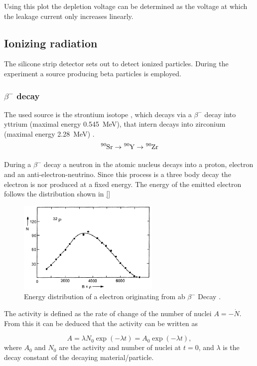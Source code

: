 Using this plot the depletion voltage can be determined as the voltage at which the leakage current only increases linearly.

\subsection{Ionizing radiation}
The silicone strip detector sets out to detect ionized particles. During the experiment a source producing beta particles is employed.
\subsubsection{$\beta^-$ decay}
The used source is the strontium isotope , which decays via a $\beta^-$ decay into yttrium (maximal energy \qty{0.545}{\mega\eV}), that intern decays into zirconium (maximal energy \qty{2.28}{\mega\eV}) \cite{lab}.
\begin{equation}
	\ce{^{90}Sr} \rightarrow \ce{^{90}Y} \rightarrow \ce{^{90}Zr}
\end{equation}

During a $\beta^-$ decay a neutron in the atomic nucleus decays into a proton, electron and an anti-electron-neutrino. Since this process is a three body decay the electron is nor produced at a fixed energy. The energy of the emitted electron follows the distribution shown in \autoref{}


\begin{figure}
	\centering
	\includegraphics[width=0.7\linewidth]{../Assets/edist.png}
	\caption{Energy distribution of a electron originating from ab $\beta^-$ Decay \cite{lab}.}
	\label{fig:edist}
\end{figure}

The activity is defined as the rate of change of the number of nuclei $A = - \dot{N}$. From this it can be deduced that the activity can be written as

\begin{equation}
	A = \lambda N_0 \exp(-\lambda t) = A_0 \exp(-\lambda t),
\end{equation}
where $A_0$ and $N_0$ are the activity and number of nuclei at $t=0$, and $\lambda$ is the decay constant of the decaying material/particle.

